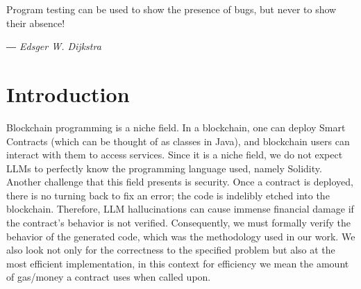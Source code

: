 \documentclass{article}
\begin{document}


\printAffiliationsAndNotice{}

\epigraph{Program testing can be used to show the presence of bugs, but never to show their absence!}
{\textit{― Edsger W. Dijkstra }}

\begin{abstract}
	In this work we want to present a workflow designed to synthesize solidity projects which are the most efficient(Hopefully).
	We succeessfully implemented an environment which constrains the LLM into following the specified workflow.
	This was done by looking at how others have approached this kind of problem and expanding on that.
	We used claude code's cli tool as an agentic wrapper because the  implementation of hooks is heavily consistent with the documentation and it did not give us many problems as others have.
	From our testing we speculate that this field is promising, and that to write efficient code we need to use fine-tuned models and the more the tokens the better the final result.
\end{abstract}

\section{Introduction}
Blockchain programming is a niche field. In a blockchain, one can deploy Smart Contracts (which can be thought of as classes in Java),
and blockchain users can interact with them to access services. Since it is a niche field, we do not expect LLMs 
to perfectly know the programming language used, namely Solidity.
Another challenge that this field presents is security. Once a contract is deployed, there is no turning back to fix an error;
the code is indelibly etched into the blockchain.
Therefore, LLM hallucinations can cause immense financial damage if the contract's behavior is not verified.
Consequently, we must formally verify the behavior of the generated code, which was the methodology used in our work.
We also look not only for the correctness to the specified problem but also at the most efficient implementation, 
in this context for efficiency we mean the amount of gas/money a contract uses when called upon.
\end{document}

